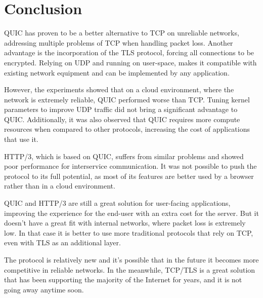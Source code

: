 \section{Conclusion}

QUIC has proven to be a better alternative to TCP on unreliable networks, addressing multiple problems of TCP when handling packet loss. Another advantage is the incorporation of the TLS protocol, forcing all connections to be encrypted. Relying on UDP and running on user-space, makes it compatible with existing network equipment and can be implemented by any application.

However, the experiments showed that on a cloud environment, where the network is extremely reliable, QUIC performed worse than TCP. Tuning kernel parameters to improve UDP traffic did not bring a significant advantage to QUIC. Additionally, it was also observed that QUIC requires more compute resources when compared to other protocols, increasing the cost of applications that use it.

HTTP/3, which is based on QUIC, suffers from similar problems and showed poor performance for interservice communication. It was not possible to push the protocol to its full potential, as most of its features are better used by a browser rather than in a cloud environment.

QUIC and HTTP/3 are still a great solution for user-facing applications, improving the experience for the end-user with an extra cost for the server. But it doesn’t have a great fit with internal networks, where packet loss is extremely low. In that case it is better to use more traditional protocols that rely on TCP, even with TLS as an additional layer.

The protocol is relatively new and it’s possible that in the future it becomes more competitive in reliable networks. In the meanwhile, TCP/TLS is a great solution that has been supporting the majority of the Internet for years, and it is not going away anytime soon.
